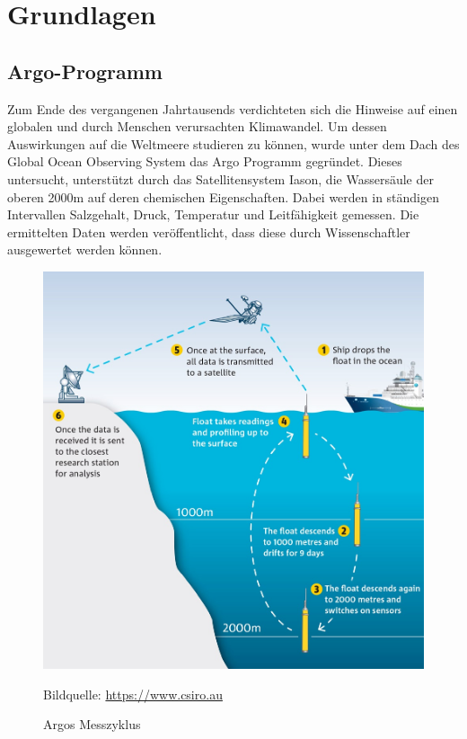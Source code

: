 \section{Grundlagen}

    
    

    \subsection{Argo-Programm}

    
    Zum Ende des vergangenen Jahrtausends verdichteten sich die Hinweise auf einen globalen und durch Menschen verursachten Klimawandel. Um dessen Auswirkungen auf die Weltmeere studieren zu können, wurde unter dem Dach des Global Ocean Observing System das Argo Programm gegründet. Dieses untersucht, unterstützt durch das Satellitensystem Iason, die Wassersäule der oberen 2000m auf deren chemischen Eigenschaften. Dabei werden in ständigen Intervallen Salzgehalt, Druck, Temperatur und Leitfähigkeit gemessen. Die ermittelten Daten werden veröffentlicht, dass diese durch Wissenschaftler ausgewertet werden können. 
    
    
    \begin{figure}[h]
        \centering
        \includegraphics{pix/operation_park_profile.jpg}
        \caption[Argos Messzyklus]{Argos  Messzyklus}
        \footnotesize{
            Bildquelle: \href{https://www.csiro.au/en/Research/OandA/Areas/Marine-technologies/Argo-robotic-floats}
                        {\url{https://www.csiro.au}}
        }
        \label{fig:Argo-messzyklus}
    \end{figure}

